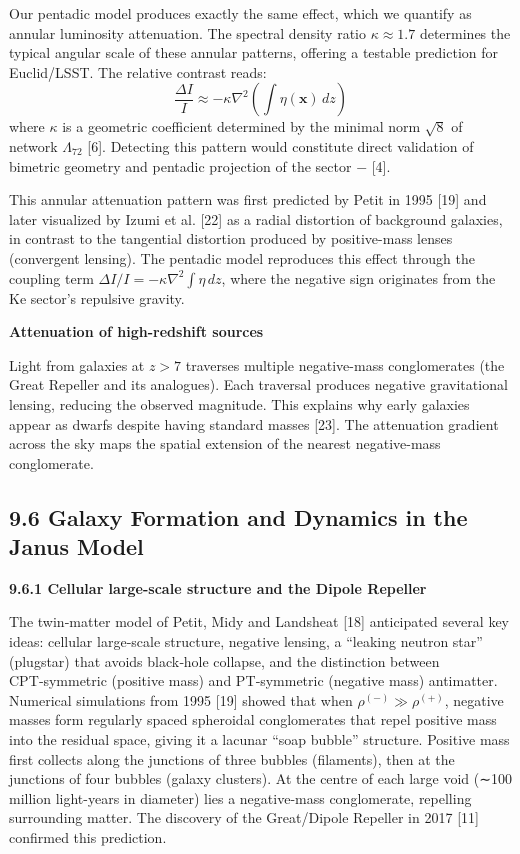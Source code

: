 \documentclass[11pt]{article}
\begin{document}
Our pentadic model produces exactly the same effect, which we quantify
as annular luminosity attenuation. The spectral density ratio
\(\kappa \approx 1.7\) determines the typical angular scale of these
annular patterns, offering a testable prediction for Euclid/LSST. The
relative contrast reads: \[
\frac{\Delta I}{I} \approx -\kappa \nabla^2 \left( \int \eta(\mathbf{x}) \, dz \right)
\] where \(\kappa\) is a geometric coefficient determined by the minimal
norm \(\sqrt{8}\) of network \(\Lambda_{72}\) {[}6{]}. Detecting this
pattern would constitute direct validation of bimetric geometry and
pentadic projection of the sector \(-\) {[}4{]}.

This annular attenuation pattern was first predicted by Petit in 1995
{[}19{]} and later visualized by Izumi et al. {[}22{]} as a radial
distortion of background galaxies, in contrast to the tangential
distortion produced by positive-mass lenses (convergent lensing). The
pentadic model reproduces this effect through the coupling term
\(\Delta I/I = -\kappa \nabla^2 \int \eta \, dz\), where the negative
sign originates from the Ke sector's repulsive gravity.

\textbf{Attenuation of high-redshift sources}

Light from galaxies at \(z > 7\) traverses multiple negative-mass
conglomerates (the Great Repeller and its analogues). Each traversal
produces negative gravitational lensing, reducing the observed
magnitude. This explains why early galaxies appear as dwarfs despite
having standard masses {[}23{]}. The attenuation gradient across the sky
maps the spatial extension of the nearest negative-mass conglomerate.

\hypertarget{galaxy-formation-and-dynamics-in-the-janus-model}{%
\subsection{9.6 Galaxy Formation and Dynamics in the Janus
Model}\label{galaxy-formation-and-dynamics-in-the-janus-model}}

\textbf{9.6.1 Cellular large-scale structure and the Dipole Repeller}

The twin‑matter model of Petit, Midy and Landsheat {[}18{]} anticipated
several key ideas: cellular large‑scale structure, negative lensing, a
``leaking neutron star'' (plugstar) that avoids black‑hole collapse, and
the distinction between CPT‑symmetric (positive mass) and PT‑symmetric
(negative mass) antimatter. Numerical simulations from 1995 {[}19{]}
showed that when \(\rho^{(-)} \gg \rho^{(+)}\), negative masses form
regularly spaced spheroidal conglomerates that repel positive mass into
the residual space, giving it a lacunar ``soap bubble'' structure.
Positive mass first collects along the junctions of three bubbles
(filaments), then at the junctions of four bubbles (galaxy clusters). At
the centre of each large void (∼100 million light-years in diameter)
lies a negative-mass conglomerate, repelling surrounding matter. The
discovery of the Great/Dipole Repeller in 2017 {[}11{]} confirmed this
prediction.
\end{document}
